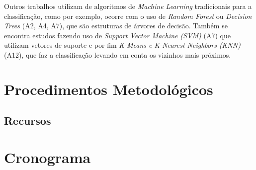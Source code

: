 Outros trabalhos utilizam de algoritmos de \emph{Machine Learning} tradicionais para a classificação, como por exemplo, ocorre com o uso de \emph{Random Forest} ou \emph{Decision Trees}  (A2, A4, A7), que são estruturas de árvores de decisão. Também se encontra estudos fazendo uso de \emph{Support Vector Machine (SVM)} (A7) que utilizam vetores de suporte e por fim \emph{K-Means e K-Nearest Neighbors (KNN)} (A12), que faz a classificação levando em conta os vizinhos mais próximos.

\chapter{Procedimentos Metodológicos}
\label{chap:metodologia}

\section{Recursos}

\chapter{Cronograma}
\label{chap:cronograma}


